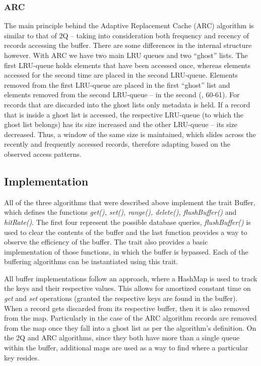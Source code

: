 \documentclass[a4paper, twocolumn,11pt]{article}
\begin{document}
\subsubsection{ARC}
The main principle behind the Adaptive Replacement Cache (ARC) algorithm is similar to that of 2Q – taking into consideration both frequency and recency of records accessing the buffer. There are some differences in the internal structure however. With ARC we have two main LRU queues and two “ghost” lists. The first LRU-queue holds elements that have been accessed once, whereas elements accessed for the second time are placed in the second LRU-queue. Elements removed from the first LRU-queue are placed in the first “ghost” list and elements removed from the second LRU-queue – in the second (\cite{Megiddo}, 60-61). For records that are discarded into the ghost lists only metadata is held. If a record that is inside a ghost list is accessed, the respective LRU-queue (to which the ghost list belongs) has its size increased and the other LRU-queue – its size decreased. Thus, a window of the same size is maintained, which slides across the recently and frequently accessed records, therefore adapting based on the observed access patterns.

\subsection{Implementation}
All of the three algorithms that were described above implement the trait Buffer, which defines the functions \textit{get(), set(), range(), delete(), flushBuffer()} and \textit{hitRate()}. The first four represent the possible database queries, \textit{flushBuffer()} is used to clear the contents of the buffer and the last function provides a way to observe the efficiency of the buffer. The trait also provides a basic implementation of those functions, in which the buffer is bypassed. Each of the buffering algorithms can be instantiated using this trait. 

All buffer implementations follow an approach, where a HashMap is used to track the keys and their respective values. This allows for amortized constant time on \textit{get} and \textit{set} operations (granted the respective keys are found in the buffer). When a record gets discarded from its respective buffer, then it is also removed from the map. Particularly in the case of the ARC algorithm records are removed from the map once they fall into a ghost list as per the algorithm’s definition. On the 2Q and ARC algorithms, since they both have more than a single queue within the buffer, additional maps are used as a way to find where a particular key resides. 
\end{document}
